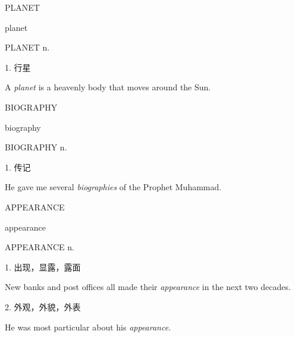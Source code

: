\begin{flashcard}{
PLANET

planet
}
\begin{center}
PLANET n. 
\end{center}
1. 行星

A \textit{planet} is a heavenly body that moves around the Sun.

\end{flashcard}
\begin{flashcard}{
BIOGRAPHY

biography
}
\begin{center}
BIOGRAPHY n. 
\end{center}
1. 传记

He gave me several \textit{biographies} of the Prophet Muhammad.

\end{flashcard}
\begin{flashcard}{
APPEARANCE

appearance
}
\begin{center}
APPEARANCE n. 
\end{center}
1. 出现，显露，露面

New banks and post offices all made their \textit{appearance} in the next two decades.

2. 外观，外貌，外表

He was most particular about his \textit{appearance}.

\end{flashcard}
